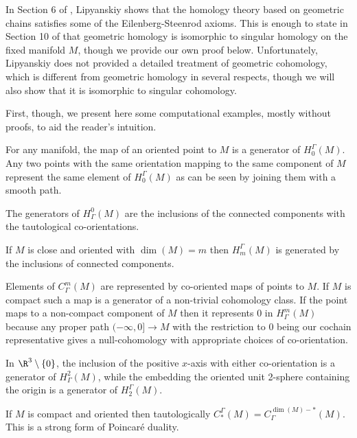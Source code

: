 In Section 6 of \cite{Lipy14}, Lipyanskiy shows that the homology theory based on geometric chains satisfies some of the Eilenberg-Steenrod axioms.
This is enough to state in Section 10 of \cite{Lipy14} that geometric homology is isomorphic to singular homology on the fixed manifold $M$, though we provide our own proof below.
Unfortunately, Lipyanskiy does not provided a detailed treatment of geometric cohomology, which is different from geometric homology in several respects, though we will also show that it is isomorphic to singular cohomology.

First, though, we present here some computational examples, mostly without proofs, to aid the reader's intuition.

\begin{example}\label{E: first examples}
	For any manifold, the map of an oriented point to $M$ is a generator of $H_0^\Gamma(M)$.
	Any two points with the same orientation mapping to the same component of $M$ represent the same element of $H_0^\Gamma(M)$ as can be seen by joining them with a smooth path.

	The generators of $H^0_\Gamma(M)$ are the inclusions of the connected components with the tautological co-orientations.

	If $M$ is close and oriented with $\dim(M) = m$ then $H_m^\Gamma(M)$ is generated by the inclusions of connected components.

	Elements of $C_\Gamma^m(M)$ are represented by co-oriented maps of points to $M$.
	If $M$ is compact such a map is a generator of a non-trivial cohomology class.
	If the point maps to a non-compact component of $M$ then it represents $0$ in $H_\Gamma^m(M)$ because any proper path $(-\infty,0] \to M$ with the restriction to $0$ being our cochain representative gives a null-cohomology with appropriate choices of co-orientation.

	In $\R^3 \setminus \{0\}$, the inclusion of the positive $x$-axis with either co-orientation is a generator of $H_\Gamma^2(M)$, while the embedding the oriented unit 2-sphere containing the origin is a generator of $H_2^\Gamma(M)$.

	If $M$ is compact and oriented then tautologically $C_*^\Gamma(M) = C_\Gamma^{\dim(M)-*}(M)$.
	This is a strong form of Poincar\'e duality.
\end{example}

